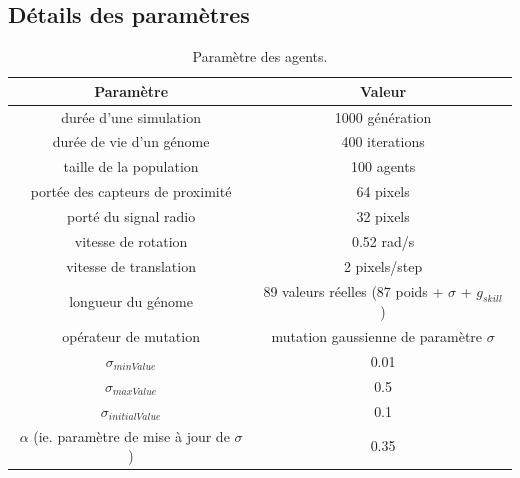 \documentclass[a4paper,10pt]{report}
\begin{document}
	\subsection{Détails des paramètres}	
	\label{ann:param}
	\begin{table}[H]
	\caption{Paramètre des agents.}
	\label{tab:params1}
	
	\begin{tabular}{cc} 
	\textbf{Paramètre} & \textbf{Valeur} \\ \hline
	durée d'une simulation & 1000 génération\\
	durée de vie d'un génome & 400 iterations \\ 
	taille de la population & 100 agents\\ 
	portée des capteurs de proximité & 64 pixels \\ 
	porté du signal radio & 32 pixels \\ 
	vitesse de rotation & 0.52 rad/s \\ %
	vitesse de translation & 2 pixels/step \\ 
	longueur du génome & 89 valeurs réelles (87 poids + $\sigma$ + $g_{skill}$) \\ 
	opérateur de mutation & mutation gaussienne de paramètre $\sigma$ \\ 
	$\sigma_{minValue}$ & 0.01\\ 
	$\sigma_{maxValue}$ & 0.5\\ 
	$\sigma_{initialValue}$ & 0.1\\ 
	$\alpha$ (ie. paramètre de mise à jour de $\sigma$ ) & 0.35 \\
	\end{tabular}
	
	\end{table}
	
\end{document}
